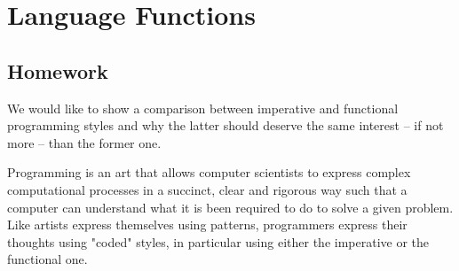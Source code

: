 
\chapter{Language Functions}

\section{Homework}

\iffalse


Imperative vs Functional style

state-oriented computation / lambda-calculus oriented
looping primitives / recursion
memory pointers / referential transparency
easy to grasp / hard to learn
difficult to reason about / allows theoretical studies

\fi

We would like to show a comparison between imperative and functional programming styles and why
the latter should deserve the same interest -- if not more -- than the
former one.

Programming is an art that allows computer scientists to express
complex computational processes in a succinct, clear and rigorous way
such that a computer can understand what it is been required to do to
solve a given problem. Like artists express themselves using
patterns, programmers express their thoughts using "coded" styles,
in particular using either the imperative or the functional one.

